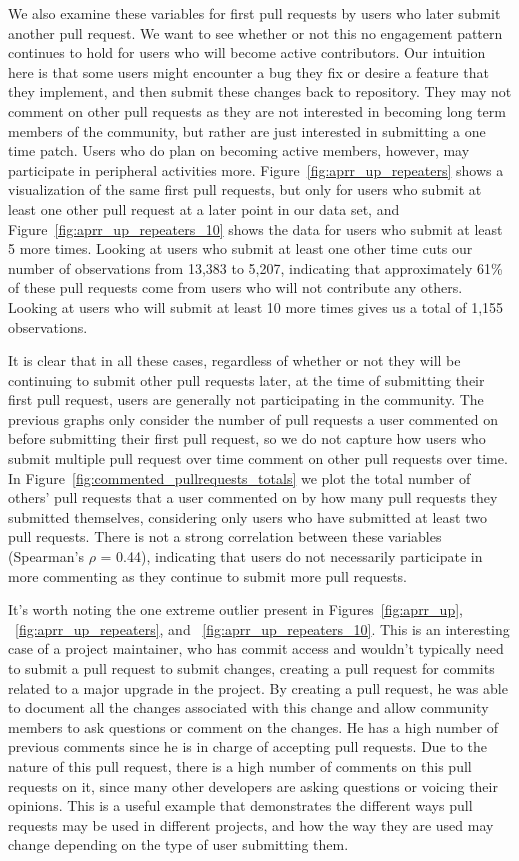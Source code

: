 \documentclass{sigchi}
\begin{document}
We also examine these variables for first pull requests by users who later
submit another pull request. We want to see whether or not this no engagement
pattern continues to hold for users who will become active contributors. Our
intuition here is that some users might encounter a bug they fix or desire a
feature that they implement, and then submit these changes back to repository.
They may not comment on other pull requests as they are not interested in
becoming long term members of the community, but rather are just interested in
submitting a one time patch. Users who do plan on becoming active members,
however, may participate in peripheral activities more.
Figure~\ref{fig:aprr_up_repeaters} shows a visualization of the same first pull
requests, but only for users who submit at least one other pull request at a
later point in our data set, and Figure~\ref{fig:aprr_up_repeaters_10} shows the
data for users who submit at least 5 more times. Looking at users who submit at
least one other time cuts our number of observations from 13,383 to 5,207,
indicating that approximately 61\% of these pull requests come from users who
will not contribute any others. Looking at users who will submit at least 10
more times gives us a total of 1,155 observations.

It is clear that in all these cases, regardless of whether or not they will be
continuing to submit other pull requests later, at the time of submitting their
first pull request, users are generally not participating in the community. The
previous graphs only consider the number of pull requests a user commented on
before submitting their first pull request, so we do not capture how users who
submit multiple pull request over time comment on other pull requests over time.
In Figure~\ref{fig:commented_pullrequests_totals} we plot the total number of
others' pull requests that a user commented on by how many pull requests they
submitted themselves, considering only users who have submitted at least two
pull requests. There is not a strong correlation between these variables
(Spearman's $\rho$  = 0.44), indicating that users do not necessarily
participate in more commenting as they continue to submit more pull requests.

It's worth noting the one extreme outlier present in
Figures~\ref{fig:aprr_up}, ~\ref{fig:aprr_up_repeaters}, and
~\ref{fig:aprr_up_repeaters_10}. This is an interesting case of a project
maintainer, who has commit access and wouldn't typically need to submit a pull
request to submit changes, creating a pull request for commits related to a
major upgrade in the project. By creating a pull request, he was able to
document all the changes associated with this change and allow community members
to ask questions or comment on the changes. He has a high number of previous
comments since he is in charge of accepting pull requests. Due to the nature of
this pull request, there is a high number of comments on this pull requests on
it, since many other developers are asking questions or voicing their opinions.
This is a useful example that demonstrates the different ways pull requests may
be used in different projects, and how the way they are used may change
depending on the type of user submitting them.
\end{document}
